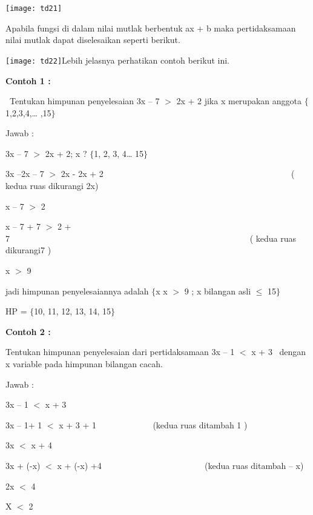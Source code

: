 \documentclass[11pt,fleqn]{book} %
\begin{document}
\noindent \texttt{[image: td21]}

\noindent Apabila fungsi di dalam nilai mutlak berbentuk ax + b maka pertidaksamaan nilai mutlak dapat diselesaikan seperti berikut.

\noindent \texttt{[image: td22]}Lebih jelasnya perhatikan contoh berikut ini.

\noindent \textbf{Contoh 1 :}

\noindent ~Tentukan himpunan penyelesaian 3x -- 7 $>$ 2x + 2 jika x merupakan anggota $\{$1,2,3,4,{\dots} ,15$\}$

\noindent 

\noindent 

\noindent 

\noindent Jawab :

\noindent 3x -- 7 $>$ 2x + 2; x ? $\{$1, 2, 3, 4{\dots} 15$\}$

\noindent 3x --2x -- 7 $>$ 2x - 2x + 2 ~~~~~~~~~~~~~~~~~~~~~~~~~~~~~~~~~~~~~~~~~~~ ( kedua ruas dikurangi 2x)

\noindent x -- 7 $>$ 2

\noindent x -- 7 + 7 $>$ 2 + 7~~~~~~~~~~~~~~~~~~~~~~~~~~~~~~~~~~~~~~~~~~~~~~~~~~~~~~~~ ( kedua ruas dikurangi7 )~~~~~~~

\noindent x $>$ 9

\noindent 

\noindent jadi himpunan penyelesaiannya adalah $\{$x {\textbar} x $>$ 9 ; x bilangan asli $\mathrm{\le}$ 15$\}$

\noindent HP = $\{$10, 11, 12, 13, 14, 15$\}$

\noindent \textbf{}

\noindent \textbf{Contoh 2 :}

\noindent Tentukan himpunan penyelesaian dari pertidaksamaan 3x -- 1 $<$ x + 3~ dengan x variable pada himpunan bilangan cacah.

\noindent Jawab :

\noindent 3x -- 1 $<$ x + 3

\noindent 3x -- 1+ 1 $<$ x + 3 + 1 ~~~~~~~~~~~~ (kedua ruas ditambah 1 )

\noindent 3x $<$ x + 4~

\noindent 3x + (-x) $<$ x + (-x) +4~ ~~~~~~~~~~~~~~~~~~~~~~ (kedua ruas ditambah -- x)

\noindent 2x $<$ 4

\noindent X $<$ 2
\end{document}
